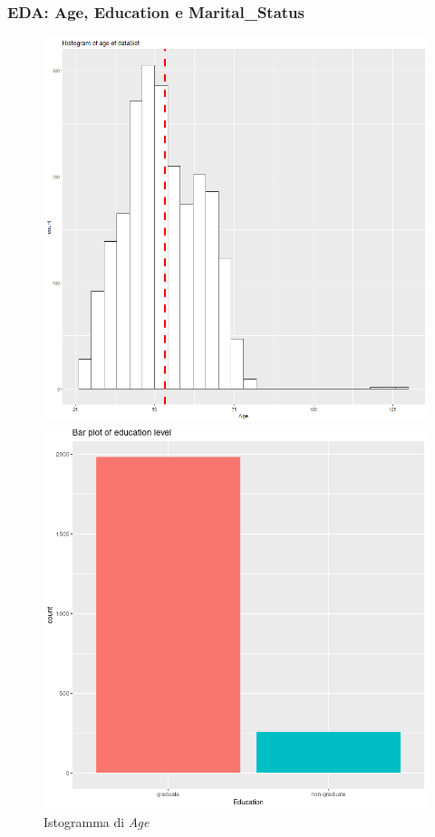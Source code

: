 \begin{frame}[fragile]
\frametitle{EDA: Age, Education  e Marital\_Status}
\begin{figure}[!htb]
  \includegraphics[width=\linewidth]{Img/eda/EDA005.png}
  \caption{Istogramma di \textit{Age}}\label{fig:HistPlotAge}
\endminipage\hfill
{}
  \includegraphics[width=\linewidth]{Img/eda/EDA007.png}

\end{figure}
\end{frame}
